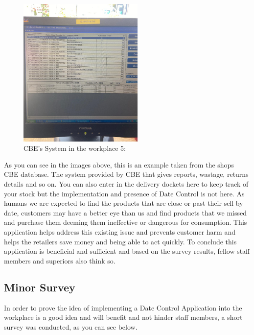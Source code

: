 \begin{figure}[h!]
	\caption{CBE's System in the workplace 5:}
	\label{image:mace5}
	\centering
	\includegraphics[width=0.55\textwidth]{images/mace5.PNG}
\end{figure}
\newpage

As you can see in the images above, this is an example taken from the shops CBE database. The system provided by CBE that gives reports, wastage, returns details and so on. You can also enter in the delivery dockets here to keep track of your stock but the implementation and presence of Date Control is not here. As humans we are expected to find the products that are close or past their sell by date, customers may have a better eye than us and find products that we missed and purchase them deeming them ineffective or dangerous for consumption. This application helps address this existing issue and prevents customer harm and helps the retailers save money and being able to act quickly. To conclude this application is beneficial and sufficient and based on the survey results, fellow staff members and superiors also think so. 

\subsection{Minor Survey}
In order to prove the idea of implementing a Date Control Application into the workplace is a good idea and will benefit and not hinder staff members, a short survey was conducted, as you can see below.

